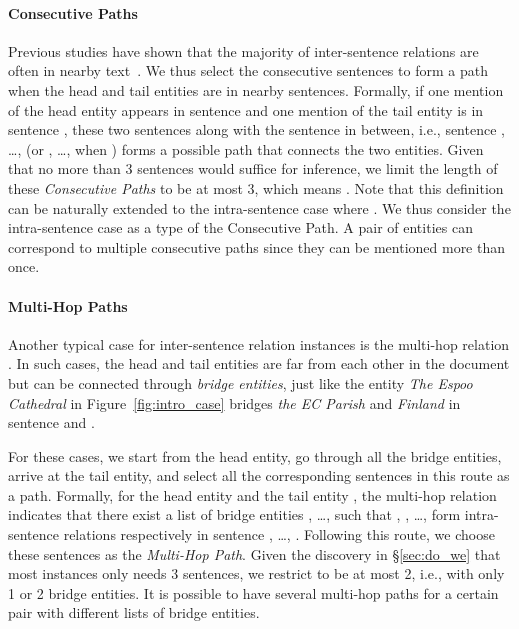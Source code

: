 \documentclass[11pt,a4paper]{article}
\begin{document}
\paragraph{Consecutive Paths}
Previous studies have shown that the majority of inter-sentence relations are often in nearby text~\cite{swampillai2010inter,quirk-poon-2017-distant}.
We thus select the consecutive sentences to form a path when the head and tail entities are in nearby sentences. Formally, if 
one mention of the head entity appears in sentence  and one mention of the tail entity is in sentence , these two sentences along with the sentence in between, i.e., sentence , …,  (or , …,  when ) forms a possible path that connects the two entities. 
Given that no more than 3 sentences would suffice for inference, we limit the length of these \textit{Consecutive Paths} to be at most 3, which means .
Note that this definition can be naturally extended to the intra-sentence case where . We thus consider the intra-sentence case as a type of the Consecutive Path.
A pair of entities can correspond to multiple consecutive paths since they can be mentioned more than once.

\paragraph{Multi-Hop Paths}
Another typical case for inter-sentence relation instances is the multi-hop relation \cite{yao_docred_2019,zeng-etal-2020-double}. In such cases, the head and tail entities are far from each other in the document but can be connected through \textit{bridge entities}, just like the entity \textit{The Espoo Cathedral} in Figure~\ref{fig:intro_case} bridges \textit{the EC Parish} and \textit{Finland} in sentence  and .

For these cases, we start from the head entity, go through all the bridge entities, arrive at the tail entity, and select all the corresponding sentences in this route as a path. Formally, for the head entity  and the tail entity , the multi-hop relation indicates that there exist a list of bridge entities , …,  such that , , …,  form  intra-sentence relations respectively in sentence , …, . Following this route, we choose these  sentences as the \textit{Multi-Hop Path}. Given the discovery in \S\ref{sec:do_we} that most instances only needs 3 sentences, we restrict  to be at most 2, i.e., with only 1 or 2 bridge entities. 
It is possible to have several multi-hop paths for a certain pair with different lists of bridge entities.
\end{document}
